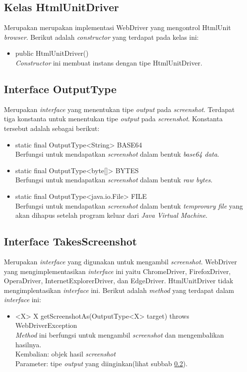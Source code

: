 \subsection{Kelas HtmlUnitDriver}
\label{subsec:htmlunitdriver}
Merupakan merupakan implementasi WebDriver yang mengontrol HtmlUnit \textit{browser}. Berikut adalah \textit{constructor} yang terdapat pada kelas ini:
\begin{itemize}
\item public HtmlUnitDriver()\\
\textit{Constructor} ini membuat instans dengan tipe HtmlUnitDriver.
\end{itemize}


\subsection{Interface OutputType}
\label{subsec:output_type}
Merupakan \textit{interface} yang menentukan tipe \textit{output} pada \textit{screenshot}. Terdapat tiga konstanta untuk menentukan tipe \textit{output} pada \textit{screenshot}. Konstanta tersebut adalah sebagai berikut:
\begin{itemize}
\item static final OutputType<String> BASE64\\
Berfungsi untuk mendapatkan \textit{screenshot} dalam bentuk \textit{base64 data}.
\item static final OutputType<byte[]> BYTES\\
Berfungsi untuk mendapatkan \textit{screenshot} dalam bentuk \textit{raw bytes}.
\item static final OutputType<java.io.File> FILE\\
Berfungsi untuk mendapatkan \textit{screenshot} dalam bentuk \textit{temprorary file} yang akan dihapus setelah program keluar dari \textit{Java Virtual Machine}.
\end{itemize}

\subsection{Interface TakesScreenshot}
\label{subsec:takes_screenshot}
Merupakan \textit{interface} yang digunakan untuk mengambil \textit{screenshot}. WebDriver yang mengimplementasikan \textit{interface} ini yaitu ChromeDriver, FirefoxDriver, OperaDriver, InternetExplorerDriver, dan  EdgeDriver. HtmlUnitDriver tidak mengimplentasikan \textit{interface} ini. Berikut adalah \textit{method} yang terdapat dalam \textit{interface} ini:
\begin{itemize}
\item <X> X getScreenshotAs(OutputType<X> target) throws WebDriverException\\
\textit{Method} ini berfungsi untuk mengambil \textit{screenshot} dan mengembalikan hasilnya.\\
Kembalian: objek hasil \textit{screenshot} \\
Parameter: tipe \textit{output} yang diinginkan(lihat subbab \ref{subsec:output_type}).
\end{itemize}


